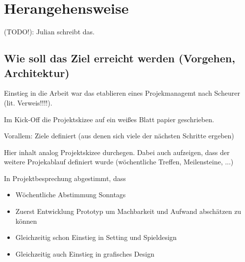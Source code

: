 
\section{Herangehensweise}

(TODO!): Julian schreibt das.

\subsection{Wie soll das Ziel erreicht werden (Vorgehen, Architektur)}


Einstieg in die Arbeit war das etablieren eines Projekmanagemt nach Scheurer (lit. Verweis!!!!).

Im Kick-Off die Projektskizee auf ein weißes Blatt papier geschrieben.

Vorallem: Ziele definiert (aus denen sich viele der nächsten Schritte ergeben)

Hier inhalt analog Projektskizee durchegen. Dabei auch aufzeigen, dass der weitere Projekablauf definiert wurde (wöchentliche Treffen, Meilensteine, ...)


In Projektbesprechung abgestimmt, dass 
\begin{itemize}
    \item Wöchentliche Abstimmung Sonntags
    \item Zuerst Entwicklung Prototyp um Machbarkeit und Aufwand abschätzen zu können 
    \item Gleichzeitig schon Einstieg in Setting und Spieldesign
    \item Gleichzeitig auch Einstieg in grafisches Design 
\end{itemize}




